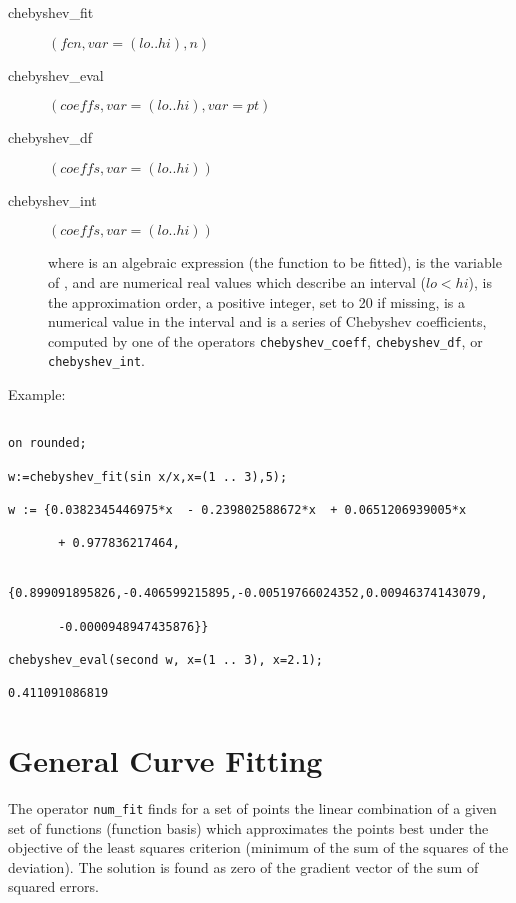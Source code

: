 \begin{description}
\item[chebyshev\_fit] $(fcn,var=(lo .. hi),n)$

\item[chebyshev\_eval] $(coeffs,var=(lo .. hi),var=pt)$

\item[chebyshev\_df] $(coeffs,var=(lo .. hi))$

\item[chebyshev\_int] $(coeffs,var=(lo .. hi))$

where  is an algebraic expression (the function to be
fitted),  is the variable of ,  and  are
numerical real values which describe an interval ($lo < hi$),
 is the approximation order, a positive integer, set to 20 if missing,
 is a numerical value in the interval and  is
a series of Chebyshev coefficients, computed by one of the operators
\texttt{chebyshev\_coeff}, \texttt{chebyshev\_df}, or \texttt{chebyshev\_int}.
\end{description}

Example:

\begin{verbatim}

on rounded;

w:=chebyshev_fit(sin x/x,x=(1 .. 3),5);

w := {0.0382345446975*x  - 0.239802588672*x  + 0.0651206939005*x

       + 0.977836217464,

      {0.899091895826,-0.406599215895,-0.00519766024352,0.00946374143079,

       -0.0000948947435876}}

chebyshev_eval(second w, x=(1 .. 3), x=2.1);

0.411091086819

\end{verbatim}

\section{General Curve Fitting}
\hypertarget{operator:NUM_FIT}{}

The operator \texttt{num\_fit} finds for a set of
points the linear combination of a given set of
functions (function basis) which approximates the
points best under the objective of the least squares
criterion (minimum of the sum of the squares of the deviation).
The solution is found as zero of the
gradient vector of the sum of squared errors.

